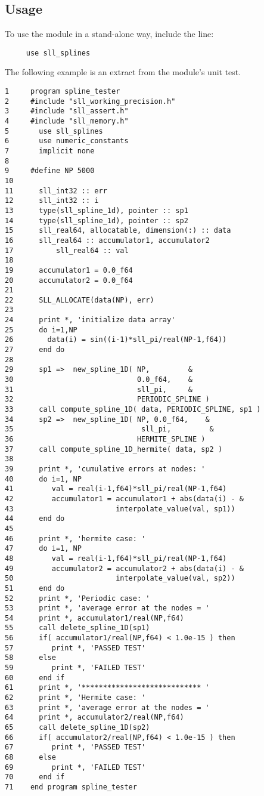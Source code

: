 \documentclass[]{report}   %
\begin{document}
\subsection{Usage}
To use the module in a stand-alone way, include the line:\
\begin{verbatim}
     use sll_splines
\end{verbatim}
The following example is an extract from the module's unit test.
\begin{verbatim}
1     program spline_tester
2     #include "sll_working_precision.h"
3     #include "sll_assert.h"
4     #include "sll_memory.h"
5       use sll_splines
6       use numeric_constants
7       implicit none
8
9     #define NP 5000
10
11      sll_int32 :: err
12      sll_int32 :: i
13      type(sll_spline_1d), pointer :: sp1
14      type(sll_spline_1d), pointer :: sp2
15      sll_real64, allocatable, dimension(:) :: data
16      sll_real64 :: accumulator1, accumulator2
17          sll_real64 :: val
18
19      accumulator1 = 0.0_f64
20      accumulator2 = 0.0_f64
21    
22      SLL_ALLOCATE(data(NP), err)
23 
24      print *, 'initialize data array'
25      do i=1,NP
26        data(i) = sin((i-1)*sll_pi/real(NP-1,f64))
27      end do
28
29      sp1 =>  new_spline_1D( NP,         &
30                             0.0_f64,    &
31                             sll_pi,     &
32                             PERIODIC_SPLINE )
33      call compute_spline_1D( data, PERIODIC_SPLINE, sp1 )
34      sp2 =>  new_spline_1D( NP, 0.0_f64,    &
35	                            sll_pi,         &	
36                             HERMITE_SPLINE )
37      call compute_spline_1D_hermite( data, sp2 )
38  
39      print *, 'cumulative errors at nodes: '
40      do i=1, NP
41         val = real(i-1,f64)*sll_pi/real(NP-1,f64)
42         accumulator1 = accumulator1 + abs(data(i) - &
43                        interpolate_value(val, sp1))
44      end do
45
46      print *, 'hermite case: '
47      do i=1, NP
48         val = real(i-1,f64)*sll_pi/real(NP-1,f64)
49         accumulator2 = accumulator2 + abs(data(i) - &
50                        interpolate_value(val, sp2))
51      end do
52      print *, 'Periodic case: '
53      print *, 'average error at the nodes = '
54      print *, accumulator1/real(NP,f64)
55      call delete_spline_1D(sp1)
56      if( accumulator1/real(NP,f64) < 1.0e-15 ) then 
57         print *, 'PASSED TEST'
58      else
59         print *, 'FAILED TEST'
60      end if
61      print *, '**************************** '
62      print *, 'Hermite case: '
63      print *, 'average error at the nodes = '
64      print *, accumulator2/real(NP,f64)
65      call delete_spline_1D(sp2)
66      if( accumulator2/real(NP,f64) < 1.0e-15 ) then 
67         print *, 'PASSED TEST'
68      else
69         print *, 'FAILED TEST'
70      end if
71    end program spline_tester
\end{verbatim}
\end{document}

